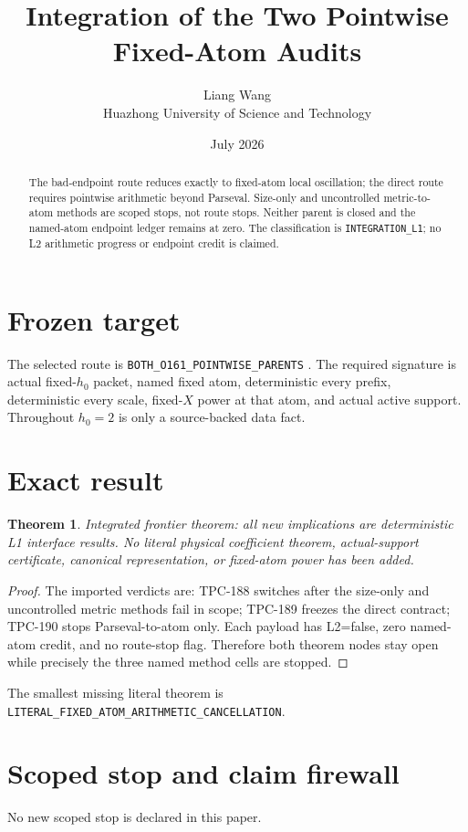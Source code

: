 \documentclass[11pt]{article}
\title{\textbf{Integration of the Two Pointwise Fixed-Atom Audits}}
\author{Liang Wang\\Huazhong University of Science and Technology}
\date{July 2026}
\newtheorem{theorem}{Theorem}
\begin{document}
\maketitle
\begin{abstract}
The bad-endpoint route reduces exactly to fixed-atom local oscillation; the direct route requires pointwise arithmetic beyond Parseval.  Size-only and uncontrolled metric-to-atom methods are scoped stops, not route stops.  Neither parent is closed and the named-atom endpoint ledger remains at zero.
The classification is \texttt{INTEGRATION\_\allowbreak{}L1}; no L2 arithmetic
progress or endpoint credit is claimed.
\end{abstract}

\section{Frozen target}
The selected route is \texttt{BOTH\_\allowbreak{}O161\_\allowbreak{}POINTWISE\_\allowbreak{}PARENTS} \citep{TPC182}.  The required
signature is actual fixed-$h_0$ packet, named fixed atom, deterministic every
prefix, deterministic every scale, fixed-$X$ power at that atom, and actual
active support.  Throughout $h_0=2$ is only a source-backed data fact.

\section{Exact result}
\begin{theorem}
Integrated frontier theorem: all new implications are deterministic L1 interface results.  No literal physical coefficient theorem, actual-support certificate, canonical representation, or fixed-atom power has been added.
\end{theorem}
\begin{proof}
The imported verdicts are: TPC-188 switches after the size-only and uncontrolled metric methods fail in scope; TPC-189 freezes the direct contract; TPC-190 stops Parseval-to-atom only.  Each payload has L2=false, zero named-atom credit, and no route-stop flag.  Therefore both theorem nodes stay open while precisely the three named method cells are stopped.
\end{proof}

The smallest missing literal theorem is
\texttt{LITERAL\_\allowbreak{}FIXED\_\allowbreak{}ATOM\_\allowbreak{}ARITHMETIC\_\allowbreak{}CANCELLATION}.

\section{Scoped stop and claim firewall}
No new scoped stop is declared in this paper.
\end{document}
